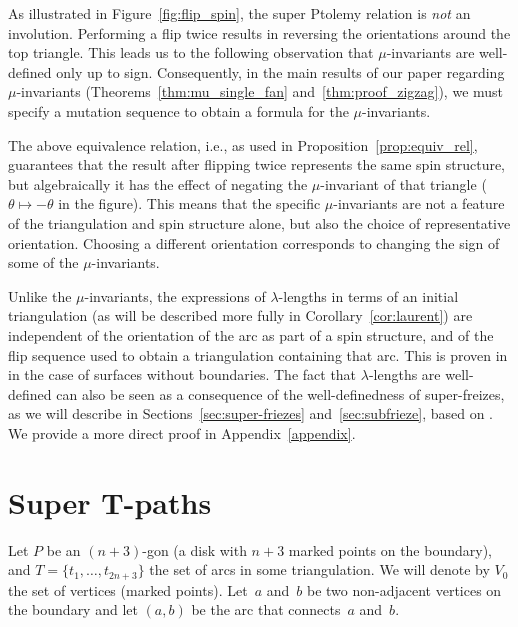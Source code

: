 

As illustrated in Figure~\ref{fig:flip_spin}, the super Ptolemy relation is \emph{not} an involution. Performing a flip
twice results in reversing the orientations around the top triangle. This leads us to the following observation that $\mu$-invariants are well-defined only up to sign. Consequently, in the main results of our paper regarding $\mu$-invariants (Theorems~\ref{thm:mu_single_fan} and~\ref{thm:proof_zigzag}), we must specify a mutation sequence to obtain a formula for the $\mu$-invariants.

\begin{Remark} \label{rem:mu-invariants}\rm
The above equivalence relation, i.e., as used in Proposition~\ref{prop:equiv_rel}, guarantees that the result after flipping twice represents the same spin structure, but algebraically it has the effect of negating the $\mu$-invariant of that triangle
($\theta \mapsto -\theta$ in the figure). This means that the specific $\mu$-invariants are not a feature of the triangulation
and spin structure alone, but also the choice of representative orientation. Choosing a different orientation corresponds to
changing the sign of some of the $\mu$-invariants.
\end{Remark}

\begin{Remark} \label{rem:lambda}\rm
Unlike the $\mu$-invariants, the expressions of $\lambda$-lengths in terms of an initial triangulation (as will be described more fully in Corollary~\ref{cor:laurent}) are independent of the orientation of the arc as part of a spin structure, and of the flip sequence used to obtain a triangulation containing that arc. This is proven in \cite{pz_19} in the case of surfaces without boundaries. The fact that $\lambda$-lengths are well-defined can also be seen as a consequence of the well-definedness of super-freizes, as we will describe in Sections~\ref{sec:super-friezes} and~\ref{sec:subfrieze}, based on \cite{M-GOT15,pz_19}. We provide a more direct proof in Appendix~\ref{appendix}.
\end{Remark}

\section[Super T-paths]{Super $\boldsymbol{T}$-paths}
Let $P$ be an $(n+3)$-gon (a disk with $n+3$ marked points on the boundary), and $T = \{t_1,\dots,t_{2n+3}\}$ the set of arcs in some triangulation.
We will denote by $V_0$ the set of vertices (marked points).
Let~$a$ and~$b$ be two non-adjacent vertices on the boundary and let $(a,b)$ be the arc that connects~$a$ and~$b$.

